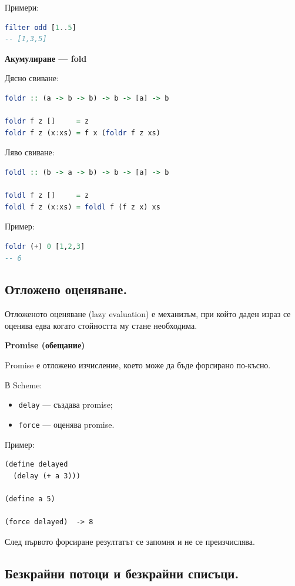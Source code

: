 \documentclass{article}
\renewcommand{\\}{\newline}
\begin{document}
Примери:
\begin{lstlisting}[language=haskell]
filter odd [1..5]
-- [1,3,5]
\end{lstlisting}

\textbf{Акумулиране --- fold}

Дясно свиване:
\begin{lstlisting}[language=haskell]
foldr :: (a -> b -> b) -> b -> [a] -> b

foldr f z []     = z
foldr f z (x:xs) = f x (foldr f z xs)
\end{lstlisting}

Ляво свиване:
\begin{lstlisting}[language=haskell]
foldl :: (b -> a -> b) -> b -> [a] -> b

foldl f z []     = z
foldl f z (x:xs) = foldl f (f z x) xs
\end{lstlisting}

Пример:
\begin{lstlisting}[language=haskell]
foldr (+) 0 [1,2,3]
-- 6
\end{lstlisting}

\subsection{Отложено оценяване.}

Отложеното оценяване (lazy evaluation) е механизъм, при който даден израз се оценява едва когато стойността му стане необходима.

\textbf{Promise (обещание)}

Promise е отложено изчисление, което може да бъде форсирано по-късно.

В Scheme:
\begin{itemize}
    \item \texttt{delay} --- създава promise;
    \item \texttt{force} --- оценява promise.
\end{itemize}

Пример:
\begin{lstlisting}
(define delayed
  (delay (+ a 3)))

(define a 5)

(force delayed)  -> 8
\end{lstlisting}

След първото форсиране резултатът се запомня и не се преизчислява.

\subsection{Безкрайни потоци и безкрайни списъци.}
\end{document}
